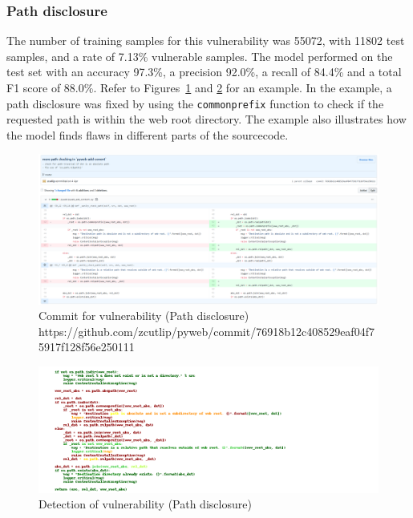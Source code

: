 \documentclass[
a4paper,
pagesize,
pdftex,
12pt,
twoside, %
BCOR=5mm, %
ngerman,
fleqn,
final,
]{scrartcl}
\begin{document}
	
	\newpage
	\subsubsection{Path disclosure}
	The number of training samples for this vulnerability was 55072, with 11802 test samples, and a rate of 7.13\% vulnerable samples. The model performed on the test set with an accuracy 97.3\%, a precision 92.0\%, a recall of 84.4\% and a total F1 score of 88.0\%. Refer to Figures~\ref{fig:path_disclosureB} and \ref{fig:path_disclosureBr} for an example. In the example, a path disclosure was fixed by using the \texttt{commonprefix} function to check if the requested path is within the web root directory. The example also illustrates how the model finds flaws in different parts of the sourcecode.
	
	\begin{figure}[H]
		\centering
		\includegraphics[width=\linewidth]{Images/path_disclosureC}
		\caption{Commit for vulnerability (Path disclosure) \newline \scriptsize{https://github.com/zcutlip/pyweb/commit/76918b12c408529eaf04f75917f128f56e250111}}
		\label{fig:path_disclosureB}
	\end{figure}
	\begin{figure}[H]
		\centering
		\includegraphics[width=\linewidth]{Images/path_disclosureCr}
		\caption{Detection of vulnerability (Path disclosure)}
		\label{fig:path_disclosureBr}
	\end{figure}
	
\end{document}
